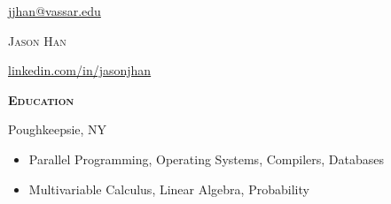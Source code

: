 \documentclass[12pt]{article}
\newcommand\textbox[1]{%
  \parbox{.333\textwidth}{#1}%
}
\begin{document}
{\centering
  \textbox{\href{mailto:jjhan@vassar.edu}{jjhan@vassar.edu}}%
  \hfill {\huge \scshape {Jason Han}} \hfill%
  \textbox{\hfill \href{https://www.linkedin.com/in/jasonjhan/}
    {linkedin.com/in/jasonjhan}}\par
}

\vspace{-0.5em}
\hrulefill

\begin{minipage}[t]{0.15\textwidth}\vspace{-0.5em}%
  {\color{Red} \textbf{\textsc{Education}}}
\end{minipage}
\hfill
\begin{minipage}[t]{0.82\textwidth}\vspace{-0.5em}%
  \vspace{-1pt}
    {Poughkeepsie, NY}
  \begin{itemize}
    \item Parallel Programming, Operating Systems, Compilers, Databases
    \item Multivariable Calculus, Linear Algebra, Probability
  \end{itemize}
\end{minipage}

\vspace{0.75em}
{\color{Red} \hrulefill}
\end{document}
